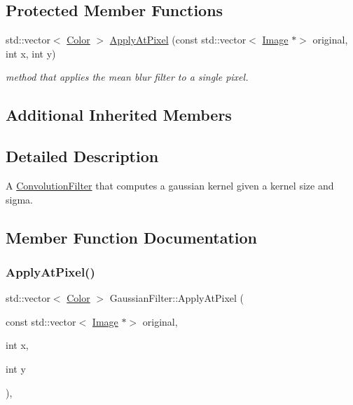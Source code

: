 \subsection*{Protected Member Functions}
\begin{DoxyCompactItemize}
\item 
std\+::vector$<$ \hyperlink{classColor}{Color} $>$ \hyperlink{classGaussianFilter_af8bf2d0f68642e6232f8b73ef1bee512}{Apply\+At\+Pixel} (const std\+::vector$<$ \hyperlink{classImage}{Image} $\ast$$>$ original, int x, int y)
\begin{DoxyCompactList}\small\item\em method that applies the mean blur filter to a single pixel. \end{DoxyCompactList}\end{DoxyCompactItemize}
\subsection*{Additional Inherited Members}


\subsection{Detailed Description}
A \hyperlink{classConvolutionFilter}{Convolution\+Filter} that computes a gaussian kernel given a kernel size and sigma. 

\subsection{Member Function Documentation}
\mbox{\label{classGaussianFilter_af8bf2d0f68642e6232f8b73ef1bee512}} 
\subsubsection{\texorpdfstring{Apply\+At\+Pixel()}{ApplyAtPixel()}}
{\footnotesize\ttfamily std\+::vector$<$ \hyperlink{classColor}{Color} $>$ Gaussian\+Filter\+::\+Apply\+At\+Pixel (\begin{DoxyParamCaption}\item[{const std\+::vector$<$ \hyperlink{classImage}{Image} $\ast$$>$}]{original,  }\item[{int}]{x,  }\item[{int}]{y }\end{DoxyParamCaption})\hspace{0.3cm}{\ttfamily [protected]}, {\ttfamily [virtual]}}



